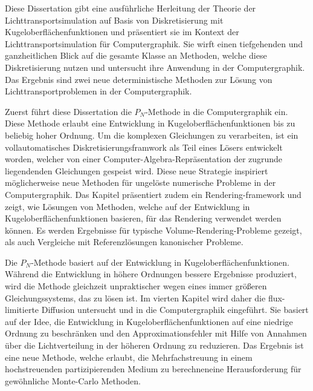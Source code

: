 Diese Dissertation gibt eine ausführliche Herleitung der Theorie der Lichttransportsimulation auf Basis von Diskretisierung mit Kugeloberflächenfunktionen und präsentiert sie im Kontext der Lichttransportsimulation für Computergraphik. Sie wirft einen tiefgehenden und ganzheitlichen Blick auf die gesamte Klasse an Methoden, welche diese Diskretisierung nutzen und untersucht ihre Anwendung in der Computergraphik. Das Ergebnis sind zwei neue deterministische Methoden zur Lösung von Lichttransportproblemen in der Computergraphik.

Zuerst führt diese Dissertation die $P_N$-Methode in die Computergraphik ein. Diese Methode erlaubt eine Entwicklung in Kugeloberflächenfunktionen bis zu beliebig hoher Ordnung. Um die komplexen Gleichungen zu verarbeiten, ist ein vollautomatisches Diskretisierungsframwork als Teil eines Lösers entwickelt worden, welcher von einer Computer-Algebra-Repräsentation der zugrunde liegendenden Gleichungen gespeist wird. Diese neue Strategie inspiriert möglicherweise neue Methoden für ungelöste numerische Probleme in der Computergraphik. Das Kapitel präsentiert zudem ein Rendering-framework und zeigt, wie Lösungen von Methoden, welche auf der Entwicklung in Kugeloberflächenfunktionen basieren, für das Rendering verwendet werden können. Es werden Ergebnisse für typische Volume-Rendering-Probleme gezeigt, als auch Vergleiche mit Referenzlösungen kanonischer Probleme.

Die $P_N$-Methode basiert auf der Entwicklung in Kugeloberflächenfunktionen. Während die Entwicklung in höhere Ordnungen bessere Ergebnisse produziert, wird die Methode gleichzeit unpraktischer wegen eines immer größeren Gleichungssystems, das zu lösen ist. Im vierten Kapitel wird daher die flux-limitierte Diffusion untersucht und in die Computergraphik eingeführt. Sie basiert auf der Idee, die Entwicklung in Kugeloberflächenfunktionen auf eine niedrige Ordnung zu beschränken und den Approximationsfehler mit Hilfe von Annahmen über die Lichtverteilung in der höheren Ordnung zu reduzieren. Das Ergebnis ist eine neue Methode, welche erlaubt, die Mehrfachstreuung in einem hochstreuenden partizipierenden Medium zu berechnen\mydash eine Herausforderung für gewöhnliche Monte-Carlo Methoden.
%
